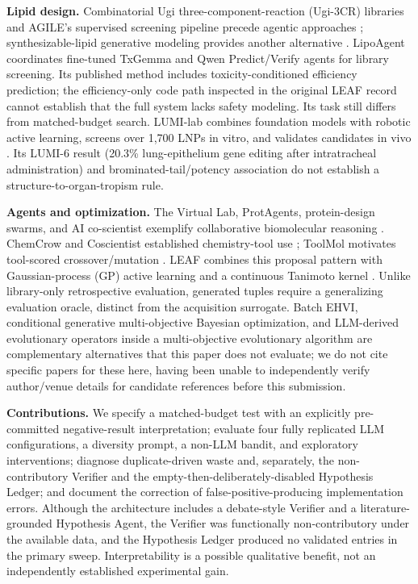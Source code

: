 \documentclass{article}
\begin{document}
\textbf{Lipid design.} Combinatorial Ugi three-component-reaction (Ugi-3CR) libraries and AGILE's supervised screening pipeline precede agentic approaches \citep{xu2023ugi,xu2024agile}; synthesizable-lipid generative modeling provides another alternative \citep{zhu2024generative}. LipoAgent \citep{li2025lipoagent} coordinates fine-tuned TxGemma and Qwen Predict/Verify agents for library screening. Its published method includes toxicity-conditioned efficiency prediction; the efficiency-only code path inspected in the original LEAF record cannot establish that the full system lacks safety modeling. Its task still differs from matched-budget search. LUMI-lab combines foundation models with robotic active learning, screens over 1,700 LNPs in vitro, and validates candidates in vivo \citep{lumilab2026}. Its LUMI-6 result (20.3\% lung-epithelium gene editing after intratracheal administration) and brominated-tail/potency association do not establish a structure-to-organ-tropism rule.

\textbf{Agents and optimization.} The Virtual Lab, ProtAgents, protein-design swarms, and AI co-scientist exemplify collaborative biomolecular reasoning \citep{swanson2025virtuallab,protagents2025,swarmdesign2025,gottweis2026}. ChemCrow and Coscientist established chemistry-tool use \citep{bran2023chemcrow,boiko2023coscientist}; ToolMol motivates tool-scored crossover/mutation \citep{toolmol2026}. LEAF combines this proposal pattern with Gaussian-process (GP) active learning and a continuous Tanimoto kernel \citep{gessner2024,srinivas2009,rasmussen2006,settles2012}. Unlike library-only retrospective evaluation, generated tuples require a generalizing evaluation oracle, distinct from the acquisition surrogate. Batch EHVI, conditional generative multi-objective Bayesian optimization, and LLM-derived evolutionary operators inside a multi-objective evolutionary algorithm are complementary alternatives that this paper does not evaluate; we do not cite specific papers for these here, having been unable to independently verify author/venue details for candidate references before this submission.

\textbf{Contributions.} We specify a matched-budget test with an explicitly pre-committed negative-result interpretation; evaluate four fully replicated LLM configurations, a diversity prompt, a non-LLM bandit, and exploratory interventions; diagnose duplicate-driven waste and, separately, the non-contributory Verifier and the empty-then-deliberately-disabled Hypothesis Ledger; and document the correction of false-positive-producing implementation errors. Although the architecture includes a debate-style Verifier and a literature-grounded Hypothesis Agent, the Verifier was functionally non-contributory under the available data, and the Hypothesis Ledger produced no validated entries in the primary sweep. Interpretability is a possible qualitative benefit, not an independently established experimental gain.
\end{document}
